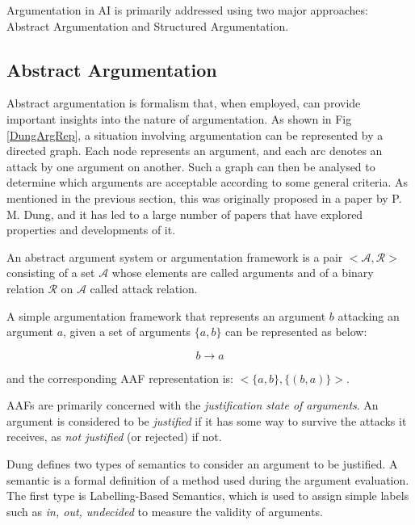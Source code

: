 \documentclass[sigconf]{acmart}
\begin{document}
Argumentation in AI is primarily addressed using two major approaches: Abstract Argumentation and Structured Argumentation.

\subsection{Abstract Argumentation}
Abstract argumentation is formalism that, when employed, can provide important insights into the nature of argumentation. As shown in Fig \ref{DungArgRep}, a situation involving argumentation can be represented by a directed graph. Each node represents an argument, and each arc denotes an attack by one argument on another. Such a graph can then be analysed to determine which arguments are acceptable according to some general criteria. As mentioned in the previous section, this was originally proposed in a paper by P. M. Dung, and it has led to a large number of papers that have explored properties and developments of it.

An abstract argument system or argumentation framework is a pair $ <\mathcal{A}, \mathcal{R}>$ consisting of a set $\mathcal{A}$ whose elements are called arguments and of a binary relation $\mathcal{R}$ on $\mathcal{A}$ called attack relation.

A simple argumentation framework that represents an argument $b$ attacking an argument $a$, given a set of arguments $\{a, b\}$ can be represented as below:

$$
b \rightarrow a
$$

and the corresponding AAF representation is: $<\{a, b\}, \{(b, a)\}>$.

AAFs are primarily concerned with the \textit{justification state of arguments}. An argument is considered to be \textit{justified} if it has some way to survive the attacks it receives, as \textit{not justified} (or rejected) if not.


Dung defines two types of semantics to consider an argument to be justified. A semantic is a formal definition of a method used during the argument evaluation. The first type is Labelling-Based Semantics, which is used to assign simple labels such as \textit{in, out, undecided} to measure the validity of arguments. 
\end{document}
